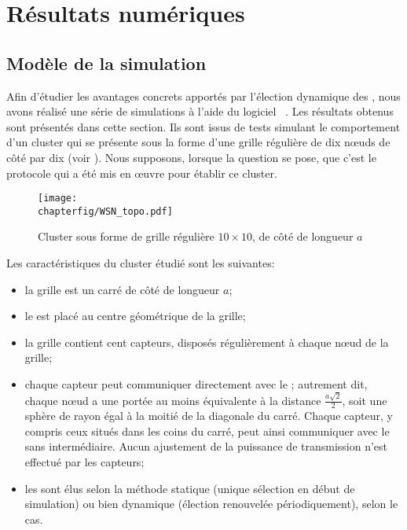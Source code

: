 \section{Résultats numériques}
\label{sa:sec:resultats}
    \subsection{Modèle de la simulation}

Afin d'étudier les avantages concrets apportés par l'élection dynamique des \cns, nous avons réalisé une série de simulations à l'aide du logiciel \nsii~\cite{ns2}.
Les résultats obtenus sont présentés dans cette section.
Ils sont issus de tests simulant le comportement d'un cluster qui se présente sous la forme d'une grille régulière de dix nœuds de côté par dix (voir ).
Nous supposons, lorsque la question se pose, que c'est le protocole \leach qui a été mis en œuvre pour établir ce cluster.
\begin{figure}[!b]
    \centering
    \texttt{[image: \\chapterfig/WSN\_topo.pdf]}
    \caption{Cluster sous forme de grille régulière $10 \times 10$, de côté de longueur $a$}\label{sa:fig:grille}
\end{figure}

Les caractéristiques du cluster étudié sont les suivantes:
\begin{itemize}
    \item la grille est un carré de côté de longueur $a$;
    \item le \ch est placé au centre géométrique de la grille;
    \item la grille contient cent capteurs, disposés régulièrement à chaque nœud de la grille;
    \item chaque capteur peut communiquer directement avec le \ch; autrement dit, chaque nœud a une portée au moins équivalente à la distance $\frac{a \sqrt{2}}{2}$, soit une sphère de rayon égal à la moitié de la diagonale du carré. Chaque capteur, y compris ceux situés dans les coins du carré, peut ainsi communiquer avec le \ch sans intermédiaire. Aucun ajustement de la puissance de transmission n'est effectué par les capteurs;
    \item les \cns sont élus selon la méthode statique (unique sélection en début de simulation) ou bien dynamique (élection renouvelée périodiquement), selon le cas.
\end{itemize}


